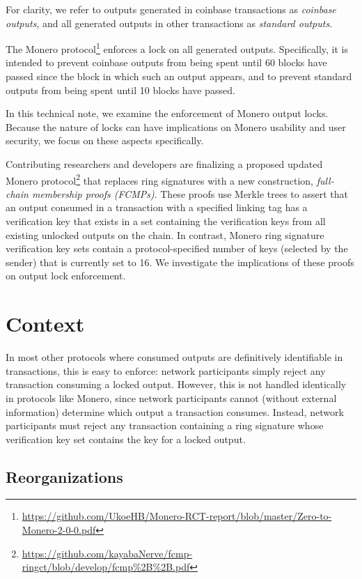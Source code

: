 \documentclass{article}
\theoremstyle{definition}
\begin{document}
For clarity, we refer to outputs generated in coinbase transactions as \textit{coinbase outputs}, and all generated outputs in other transactions as \textit{standard outputs}.

The Monero protocol\footnote{\url{https://github.com/UkoeHB/Monero-RCT-report/blob/master/Zero-to-Monero-2-0-0.pdf}} enforces a lock on all generated outputs.
Specifically, it is intended to prevent coinbase outputs from being spent until 60 blocks have passed since the block in which such an output appears, and to prevent standard outputs from being spent until 10 blocks have passed.

In this technical note, we examine the enforcement of Monero output locks.
Because the nature of locks can have implications on Monero usability and user security, we focus on these aspects specifically.

Contributing researchers and developers are finalizing a proposed updated Monero protocol\footnote{\url{https://github.com/kayabaNerve/fcmp-ringct/blob/develop/fcmp\%2B\%2B.pdf}} that replaces ring signatures with a new construction, \textit{full-chain membership proofs (FCMPs)}.
These proofs use Merkle trees to assert that an output consumed in a transaction with a specified linking tag has a verification key that exists in a set containing the verification keys from all existing unlocked outputs on the chain.
In contrast, Monero ring signature verification key sets contain a protocol-specified number of keys (selected by the sender) that is currently set to 16.
We investigate the implications of these proofs on output lock enforcement.


\section{Context}

In most other protocols where consumed outputs are definitively identifiable in transactions, this is easy to enforce: network participants simply reject any transaction consuming a locked output.
However, this is not handled identically in protocols like Monero, since network participants cannot (without external information) determine which output a transaction consumes.
Instead, network participants must reject any transaction containing a ring signature whose verification key set contains the key for a locked output.


\subsection{Reorganizations}
\end{document}

